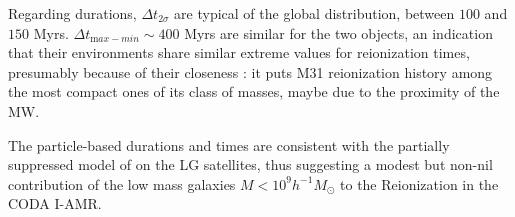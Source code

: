 \documentclass[twocolumn]{aastex61}
\begin{document}
Regarding durations, $\Delta t_{2\sigma}$ are typical of the global distribution, between $100$ and $150$ Myrs. $\Delta t_{\mathrm max-min} \sim 400$ Myrs are similar for the two objects, an indication that their environments share similar extreme values for reionization times, presumably because of their closeness : it puts M31 reionization history among the most compact ones of its class of masses, maybe due to the proximity of the MW. 

The particle-based durations and times are consistent with the partially suppressed model of \citet{DIX17} on the LG satellites, thus suggesting a modest but non-nil contribution of the low mass galaxies $M<10^9 h^{-1} M_\odot$ to the Reionization in the CODA I-AMR.


%
%
% 
\end{document}
